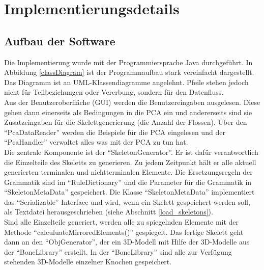 \chapter{Implementierungsdetails}
\label{chapter:implementation_detail}


\section{Aufbau der Software}
\label{software_architecture}

Die Implementierung wurde mit der Programmiersprache Java durchgeführt. In Abbildung \ref{classDiagram} ist der Programmaufbau stark vereinfacht dargestellt. Das Diagramm ist an UML-Klassendiagramme angelehnt. Pfeile stehen jedoch nicht für Teilbeziehungen oder Vererbung, sondern für den Datenfluss.\\
Aus der Benutzeroberfläche (GUI) werden die Benutzereingaben ausgelesen. Diese gehen dann einerseits als Bedingungen in die PCA ein und andererseits sind sie Zusatzeingaben für die Skelettgenerierung (\zb die Anzahl der Flossen). 
Über den "`PcaDataReader"' werden die Beispiele für die PCA eingelesen und der "`PcaHandler"' verwaltet alles was mit der PCA zu tun hat.\\
Die zentrale Komponente ist der "`SkeletonGenerator"'. Er ist dafür verantwortlich die Einzelteile des Skeletts zu generieren. Zu jedem Zeitpunkt hält er alle aktuell generierten terminalen und nichtterminalen Elemente. Die Ersetzungsregeln der Grammatik sind im "`RuleDictionary"' und die Parameter für die Grammatik in "`SkeletonMetaData"' gespeichert. Die Klasse "`SkeletonMetaData"' implementiert das "`Serializable"' Interface \cite{JavaSerialization} und wird, wenn ein Skelett gespeichert werden soll, als Textdatei herausgeschrieben (siehe Abschnitt \ref{load_skeletons}).\\
Sind alle Einzelteile generiert, werden alle zu spiegelnden Elemente mit der Methode \mbox{"`calculuateMirroredElements()"'} gespiegelt. Das fertige Skelett geht dann an den \linebreak "`ObjGenerator"', der ein 3D-Modell mit Hilfe der 3D-Modelle aus der "`BoneLibrary"' erstellt. In der "`BoneLibrary"' sind alle zur Verfügung stehenden 3D-Modelle einzelner Knochen gespeichert.

